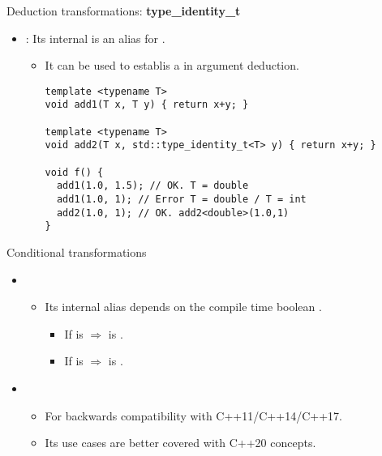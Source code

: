 \begin{frame}[t,fragile]{Deduction transformations: \textbf{type\_identity\_t}}
\begin{itemize}
  \item {}: Its internal  is an alias for .
    \begin{itemize}
      \item It can be used to establis a  in argument deduction.
\begin{lstlisting}
template <typename T>
void add1(T x, T y) { return x+y; }

template <typename T>
void add2(T x, std::type_identity_t<T> y) { return x+y; }

void f() {
  add1(1.0, 1.5); // OK. T = double
  add1(1.0, 1); // Error T = double / T = int
  add2(1.0, 1); // OK. add2<double>(1.0,1)
}
\end{lstlisting}
    \end{itemize}
\end{itemize}
\end{frame}

\begin{frame}[t,fragile]{Conditional transformations}
\begin{itemize}
  \item {}
    \begin{itemize}
      \item Its internal alias  depends on the compile time
            boolean .
        \begin{itemize}
          \item If  is  $\Rightarrow$ 
                 is .
          \item If  is  $\Rightarrow$ 
                 is .
        \end{itemize}

    \end{itemize}

  \item {}
    \begin{itemize}
      \item For backwards compatibility with C++11/C++14/C++17.
      \item Its use cases are better covered with C++20 concepts.
    \end{itemize}
\end{itemize}
\end{frame}
